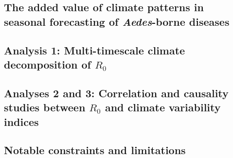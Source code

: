 \documentclass[10pt,twocolumn]{wlscirep}
\begin{document}
\subsection{The added value of climate patterns in seasonal forecasting of \textit{Aedes}-borne diseases} \label{sec-discussion-added-value}

\subsection{Analysis 1: Multi-timescale climate decomposition of $R_0$} \label{sec-discussion-analysis-1}

\subsection{Analyses 2 and 3: Correlation and causality studies between $R_0$ and climate variability indices} \label{sec-discussion-analysis-2-3}

\subsection{Notable constraints and limitations} \label{sec-discussion-limitations}
\end{document}
